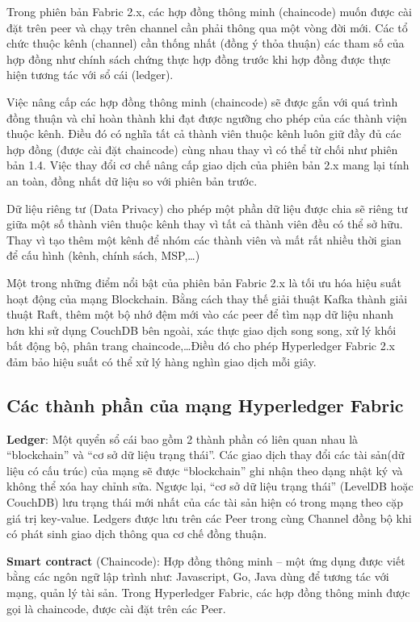 Trong phiên bản Fabric 2.x, các hợp đồng thông minh (chaincode) muốn được cài đặt trên peer và chạy trên channel cần phải thông qua một vòng đời mới. Các tổ chức thuộc kênh (channel) cần thống nhất (đồng ý thỏa thuận) các tham số của hợp đồng như chính sách chứng thực hợp đồng trước khi hợp đồng được thực hiện tương tác với sổ cái (ledger).

Việc nâng cấp các hợp đồng thông minh (chaincode) sẽ được gắn với quá trình đồng thuận và chỉ hoàn thành khi đạt được ngưỡng cho phép của các thành viện thuộc kênh. Điều đó có nghĩa tất cả thành viên thuộc kênh luôn giữ đầy đủ các hợp đồng (được cài đặt chaincode) cùng nhau thay vì có thể từ chối như phiên bản 1.4. Việc thay đổi cơ chế nâng cấp giao dịch của phiên bản 2.x mang lại tính an toàn, đồng nhất dữ liệu so với phiên bản trước.

Dữ liệu riêng tư (Data Privacy) cho phép một phần dữ liệu được chia sẽ riêng tư giữa một số thành viên thuộc kênh thay vì tất cả thành viên đều có thể sở hữu. Thay vì tạo thêm một kênh để nhóm các thành viên và mất rất nhiều thời gian để cấu hình (kênh, chính sách, MSP,…) 

Một trong những điểm nổi bật của phiên bản Fabric 2.x là tối ưu hóa hiệu suất hoạt động của mạng Blockchain. Bằng cách thay thế giải thuật Kafka thành giải thuật Raft, thêm một bộ nhớ đệm mới vào các peer để tìm nạp dữ liệu nhanh hơn khi sử dụng CouchDB bên ngoài, xác thực giao dịch song song, xử lý khối bất động bộ, phân trang chaincode,…Điều đó cho phép Hyperledger Fabric 2.x đảm bảo hiệu suất có thể xử lý hàng nghìn giao dịch mỗi giây. 

\subsection{Các thành phần của mạng Hyperledger Fabric}

\textbf{Ledger}: Một quyển sổ cái bao gồm 2 thành phần có liên quan nhau là “blockchain” và “cơ sở dữ liệu trạng thái”. Các giao dịch thay đổi các tài sản(dữ liệu có cấu trúc) của mạng sẽ được “blockchain” ghi nhận theo dạng nhật ký và không thể xóa hay chỉnh sửa. Ngược lại, “cơ sở dữ liệu trạng thái” (LevelDB hoặc CouchDB) lưu trạng thái mới nhất của các tài sản hiện có trong mạng theo cặp giá trị key-value. Ledgers được lưu trên các Peer trong cùng Channel đồng bộ khi có phát sinh giao dịch thông qua cơ chế đồng thuận.

\textbf{Smart contract} (Chaincode): Hợp đồng thông minh – một ứng dụng được viết bằng các ngôn ngữ lập trình như: Javascript, Go, Java dùng để tương tác với mạng, quản lý tài sản. Trong Hyperledger Fabric, các hợp đồng thông minh được gọi là chaincode, được cài đặt trên các Peer.

